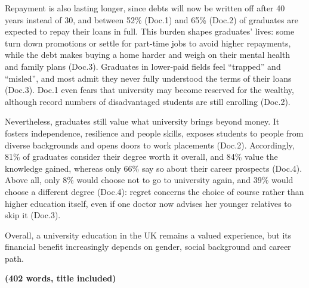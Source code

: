\documentclass[11pt,a4paper]{article}
\begin{document}
Repayment is also lasting longer, since debts will now be written off after 40 years \textbar{} instead of 30, and between 52\% (Doc.1) and 65\% (Doc.2) of graduates are expected to repay their loans in full. \textbar{} This burden shapes graduates' lives: some turn down promotions or settle for part-time jobs to avoid higher repayments, while the \textbar{} debt makes buying a home harder and weigh on their mental health and family plans (Doc.3). Graduates in lower-paid fields \textbar{} feel ``trapped'' and ``misled'', and most admit they never fully understood the terms of their loans (Doc.3). Doc.1 even fears \textbar{} that university may become reserved for the wealthy, although record numbers of disadvantaged students are still enrolling (Doc.2).

Nevertheless, graduates \textbar{} still value what university brings beyond money. It fosters independence, resilience and people skills, exposes students to people from diverse \textbar{} backgrounds and opens doors to work placements (Doc.2). Accordingly, 81\% of graduates consider their degree worth it overall, and 84\% \textbar{} value the knowledge gained, whereas only 66\% say so about their career prospects (Doc.4). Above all, only 8\% would choose \textbar{} not to go to university again, and 39\% would choose a different degree (Doc.4): regret concerns the choice of course \textbar{} rather than higher education itself, even if one doctor now advises her younger relatives to skip it (Doc.3).

Overall, a \textbar{} university education in the UK remains a valued experience, but its financial benefit increasingly depends on gender, social background and \textbar{} career path.

\textbf{(402 words, title included)}
\end{document}
